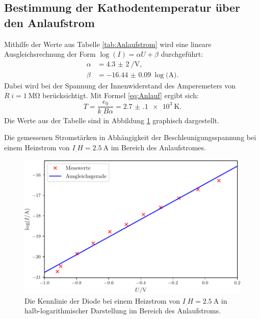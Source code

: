\subsection{Bestimmung der Kathodentemperatur über den Anlaufstrom}
\label{subsec:Temperatur}

Mithilfe der Werte aus Tabelle \ref{tab:Anlaufstrom} wird eine lineare Ausgleichsrechnung der Form $\log(I)=\alpha U+\beta$ durchgeführt:
\begin{align*}
\alpha &= \SI{4,3(2)}{\per\volt}\text{,}\\
\beta  &= \SI{-16.44(9)}{\log(\ampere)}\text{.}
\end{align*}
Dabei wird bei der Spannung der Innenwiderstand des Amperemeters von $R_.i=\SI{1}{\mega\ohm}$ berücksichtigt. Mit Formel \eqref{eq:Anlauf} ergibt sich:
\[
T = \frac{e_0}{k_.B\alpha} = \SI{2.7(1)e3}{\kelvin}\text{.}
\]
Die Werte aus der Tabelle sind in Abbildung \ref{fig:Anlaufstrom} graphisch dargestellt.

\begin{table}
\centering
\caption{Die gemessenen Stromstärken in Abhängigkeit der Beschleunigungsspannung bei einem Heizstrom von $I_.H=\SI{2,5}{\ampere}$ im Bereich des Anlaufstromes.}

\label{tab:Anlaufstrom}
\end{table}

\begin{figure}
\centering
\includegraphics[width=\linewidth-70pt,height=\textheight-70pt,keepaspectratio]{content/images/Anlaufstrom.pdf}
\caption{Die Kennlinie der Diode bei einem Heizstrom von $I_.H=\SI{2,5}{\ampere}$ in halb-logarithmischer Darstellung im Bereich des Anlaufstroms.}
\label{fig:Anlaufstrom}
\end{figure}

